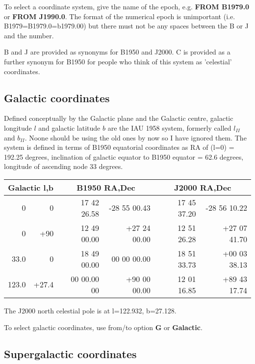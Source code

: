 To select a coordinate system, give the name of the epoch, e.g.
{\bf FROM B1979.0} or {\bf FROM J1990.0}. The format of the 
numerical epoch is unimportant (i.e. B1979=B1979.0=b1979.00) but there
must not be any spaces between the B or J and the number. 

B and J are provided
as synonyms for B1950 and J2000. C is provided as a further synonym for B1950
for people who think of this system as 'celestial' coordinates.

\subsection{Galactic coordinates}

Defined conceptually by the Galactic plane and the Galactic centre,
galactic longitude $l$ and galactic latitude $b$ are the IAU 1958 system, formerly
called $l_{II}$ and $b_{II}$. Noone should be using the old ones by now so I have ignored
them. The system is defined in terms of B1950 equatorial coordinates as
RA of (l=0) = 192.25 degrees, inclination of galactic equator to B1950 equator = 62.6 
degrees, longitude of ascending node 33 degrees. 

\begin{center}
\begin{tabular}{rrrrrr}
\multicolumn{2}{c}{Galactic l,b}
&\multicolumn{2}{c}{ B1950 RA,Dec }
&\multicolumn{2}{c}{ J2000 RA,Dec }\\
\hline
0&0& 17 42 26.58 &-28 55 00.43 &17 45 37.20&-28 56 10.22\\
0&+90& 12 49 00.00 &+27 24 00.00 &12 51 26.28 &+27 07 41.70\\
33.0&0&18 49 00.00&00 00 00.00&18 51 33.73& +00 03 38.13\\
123.0&+27.4&00 00.00 00&+90 00 00.00&12 01 16.85&+89 43 17.74\\
\end{tabular}
\end{center}

The J2000 north celestial pole is at l=122.932, b=27.128.

To select galactic coordinates, use from/to option {\bf G} or {\bf Galactic}.

\subsection{Supergalactic coordinates}

